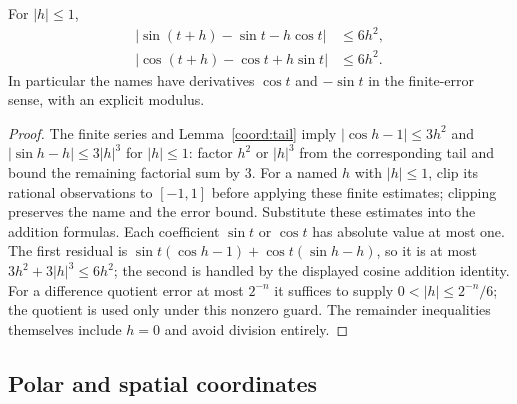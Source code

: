 \begin{theorem}
\label{coord:derivatives}
For $|h|\le1$,
\begin{align*}
 |\sin(t+h)-\sin t-h\cos t|&\le6h^2,\\
 |\cos(t+h)-\cos t+h\sin t|&\le6h^2.
\end{align*}
In particular the names have derivatives $\cos t$ and $-\sin t$ in the
finite-error sense, with an explicit modulus.
\end{theorem}
\begin{proof}
The finite series and Lemma~\ref{coord:tail} imply
$|\cos h-1|\le3h^2$ and $|\sin h-h|\le3|h|^3$ for $|h|\le1$:
factor $h^2$ or $|h|^3$ from the corresponding tail and bound the
remaining factorial sum by $3$. For a named $h$ with $|h|\le1$, clip its rational observations to $[-1,1]$ before applying these finite estimates; clipping preserves the name and the error bound. Substitute these estimates into the
addition formulas. Each coefficient $\sin t$ or $\cos t$ has absolute
value at most one. The first residual is
$\sin t(\cos h-1)+\cos t(\sin h-h)$, so it is at most
$3h^2+3|h|^3\le6h^2$; the second is handled by the displayed
cosine addition identity. For a difference quotient error at most
$2^{-n}$ it suffices to supply $0<|h|\le2^{-n}/6$; the quotient is
used only under this nonzero guard. The remainder inequalities themselves
include $h=0$ and avoid division entirely.
\end{proof}

\subsection{Polar and spatial coordinates}


